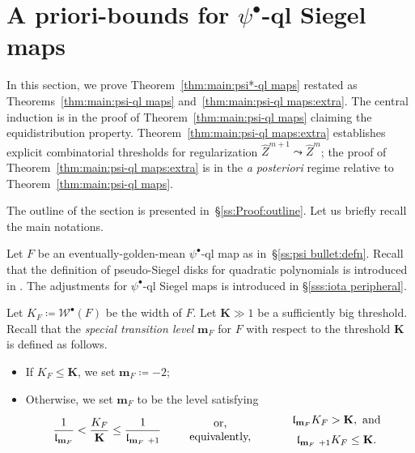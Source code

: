 \documentclass{amsart}
\renewcommand{\sp}{{\ \ }}
\newcommand{\1}{{\mathbb 1 }}
\newcommand{\Width}{{\mathcal W}}
\newcommand{\wZ}{{\widehat Z}}
\newcommand{\bK}{{\mathbf K}}
\newcommand{\bbm}{{\mathbf m}}
\newcommand{\length}{{\mathfrak l}}
\theoremstyle{remark}
\numberwithin{equation}{section}
\theoremstyle{definition}
\begin{document}
\section{A priori-bounds for $\psi^\bullet$-ql Siegel maps}\label{s:Proof}  In this section, we prove Theorem~\ref{thm:main:psi*-ql maps} restated as Theorems~\ref{thm:main:psi-ql maps} and~\ref{thm:main:psi-ql maps:extra}. The central induction is in the proof of Theorem~\ref{thm:main:psi-ql maps} claiming the equidistribution property. Theorem~\ref{thm:main:psi-ql maps:extra} establishes explicit combinatorial thresholds for regularization $\wZ^{m+1}\leadsto \wZ^m$; the proof of Theorem~\ref{thm:main:psi-ql maps:extra} is in the \emph{a posteriori} regime relative to Theorem~\ref{thm:main:psi-ql maps}.


The outline of the section is presented in~\S\ref{ss:Proof:outline}. Let us briefly recall the main notations.


Let $F$ be an eventually-golden-mean $\psi^\bullet$-ql map as in~\S\ref{ss:psi bullet:defn}. 
Recall that the definition of pseudo-Siegel disks for quadratic polynomials is introduced in \cite[Definition 5.1]{DL22}. The adjustments for $\psi^\bullet$-ql Siegel maps is introduced in \S\ref{sss:iota peripheral}.


Let $K_F\coloneqq \Width^\bullet(F)$ be the width of $F$.
Let $\bK\gg 1$ be a sufficiently big threshold.
Recall that the {\em special transition level} $\bbm_F$ for $F$ with respect to the threshold $\bK$ is defined as follows.
\begin{itemize}
    \item If $K_F\le \bK$, we set $\bbm_F\coloneqq -2$;
    \item Otherwise, we set $\bbm_F$ to be the level satisfying 
\[ \frac{1}{\length_{\bbm_F}} < \frac{K_F}{\bK} \le \frac{1}{\length_{\bbm_F\ +1}} \sp\sp\sp  \begin{array}{c}\text{ or, }\\ \text{equivalently,}\end{array}\sp\sp\sp \sp   \begin{array}{c}
\length_{\bbm_F} K_F>\bK, \text{ and}\vspace{0.2cm}\\
\length_{\bbm_F\ +1} K_F\le \bK.
\end{array} \]
\end{itemize} 
\end{document}
